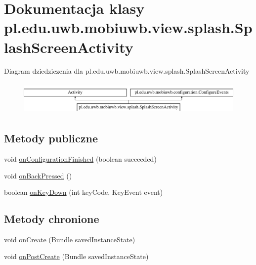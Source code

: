 \hypertarget{classpl_1_1edu_1_1uwb_1_1mobiuwb_1_1view_1_1splash_1_1_splash_screen_activity}{}\section{Dokumentacja klasy pl.\+edu.\+uwb.\+mobiuwb.\+view.\+splash.\+Splash\+Screen\+Activity}
\label{classpl_1_1edu_1_1uwb_1_1mobiuwb_1_1view_1_1splash_1_1_splash_screen_activity}
Diagram dziedziczenia dla pl.\+edu.\+uwb.\+mobiuwb.\+view.\+splash.\+Splash\+Screen\+Activity\begin{figure}[H]
\begin{center}
\leavevmode
\includegraphics[height=1.696970cm]{classpl_1_1edu_1_1uwb_1_1mobiuwb_1_1view_1_1splash_1_1_splash_screen_activity}
\end{center}
\end{figure}
\subsection*{Metody publiczne}
\begin{DoxyCompactItemize}
\item 
void \hyperlink{classpl_1_1edu_1_1uwb_1_1mobiuwb_1_1view_1_1splash_1_1_splash_screen_activity_a7d5c13f0859cc5f81ce43c978a2100aa}{on\+Configuration\+Finished} (boolean succeeded)
\item 
void \hyperlink{classpl_1_1edu_1_1uwb_1_1mobiuwb_1_1view_1_1splash_1_1_splash_screen_activity_a16932fb0eaedd38064544a41750b1ed4}{on\+Back\+Pressed} ()
\item 
boolean \hyperlink{classpl_1_1edu_1_1uwb_1_1mobiuwb_1_1view_1_1splash_1_1_splash_screen_activity_a1a013a78f4df0e952134ada8ced5bbaf}{on\+Key\+Down} (int key\+Code, Key\+Event event)
\end{DoxyCompactItemize}
\subsection*{Metody chronione}
\begin{DoxyCompactItemize}
\item 
void \hyperlink{classpl_1_1edu_1_1uwb_1_1mobiuwb_1_1view_1_1splash_1_1_splash_screen_activity_a7119663dc83d11a809885f0f0efe3329}{on\+Create} (Bundle saved\+Instance\+State)
\item 
void \hyperlink{classpl_1_1edu_1_1uwb_1_1mobiuwb_1_1view_1_1splash_1_1_splash_screen_activity_a8acb04e7bd5b4a45072bc539a40cbe47}{on\+Post\+Create} (Bundle saved\+Instance\+State)
\end{DoxyCompactItemize}


